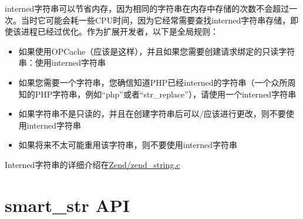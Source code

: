 interned字符串可以节省内存，因为相同的字符串在内存中存储的次数不会超过一次。当时它可能会耗一些CPU时间，因为它经常需要查找interned字符串存储，即使该进程已经过优化。作为扩展开发者，以下是全局规则：

\begin{itemize}
        \item 如果使用OPCache（应该是这样），并且如果您需要创建请求绑定的只读字符串：使用interned字符串
        \item 如果您需要一个字符串，您确信知道PHP已经interned的字符串（一个众所周知的PHP字符串，例如“php”或者“str\_replace”），请使用一个interned字符串
        \item 如果字符串不是只读的，并且在创建字符串后可以/应该进行更改，则不要使用interned字符串
        \item 如果将来不太可能重用该字符串，则不要使用interned字符串
\end{itemize}

Interned字符串的详细介绍在\href{https://github.com/php/php-src/blob/PHP-7.0/Zend/zend_string.c}{Zend/zend\_string.c}


\section{smart\_str API}























































